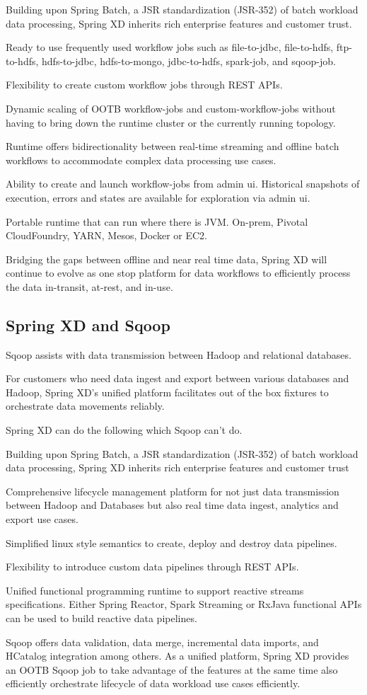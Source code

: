 \begin{itemize*}
\item Building upon Spring Batch, a JSR standardization (JSR-352) of batch workload data processing, Spring XD inherits rich enterprise features and customer trust.
\item Ready to use frequently used workflow jobs such as file-to-jdbc, file-to-hdfs, ftp-to-hdfs, hdfs-to-jdbc, hdfs-to-mongo, jdbc-to-hdfs, spark-job, and sqoop-job.
\item Flexibility to create custom workflow jobs through REST APIs.
\item Dynamic scaling of OOTB workflow-jobs and custom-workflow-jobs without having to bring down the runtime cluster or the currently running topology.
\item Runtime offers bidirectionality between real-time streaming and offline batch workflows to accommodate complex data processing use cases.
\item Ability to create and launch workflow-jobs from admin ui. Historical snapshots of execution, errors and states are available for exploration via admin ui.
\item Portable runtime that can run where there is JVM. On-prem, Pivotal CloudFoundry, YARN, Mesos, Docker or EC2.
\end{itemize*}

Bridging the gaps between offline and near real time data, Spring XD will continue to evolve as one stop platform for data workflows to efficiently process the data in-transit, at-rest, and in-use.

\subsection{Spring XD and Sqoop}
Sqoop assists with data transmission between Hadoop and relational databases.

For customers who need data ingest and export between various databases and Hadoop, Spring XD's unified platform facilitates out of the box fixtures to orchestrate data movements reliably. 

Spring XD can do the following which Sqoop can't do.

\begin{itemize*}
\item Building upon Spring Batch, a JSR standardization (JSR-352) of batch workload data processing, Spring XD inherits rich enterprise features and customer trust
\item Comprehensive lifecycle management platform for not just data transmission between Hadoop and Databases but also real time data ingest, analytics and export use cases.
\item Simplified linux style semantics to create, deploy and destroy data pipelines.
\item Flexibility to introduce custom data pipelines through REST APIs.
\item Unified functional programming runtime to support reactive streams specifications. Either Spring Reactor, Spark Streaming or RxJava functional APIs can be used to build reactive data pipelines.
\end{itemize*}

Sqoop offers data validation, data merge, incremental data imports, and HCatalog integration among others. As a unified platform, Spring XD provides an OOTB Sqoop job to take advantage of the features at the same time also efficiently orchestrate lifecycle of data workload use cases efficiently.
